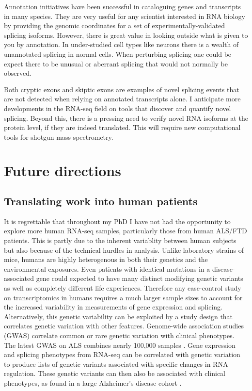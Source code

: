 Annotation initiatives have been successful in cataloguing genes and transcripts in many species.
They are very useful for any scientist interested in RNA biology by providing the genomic coordinates for a set of experimentally-validated splicing isoforms.
However, there is great value in looking outside what is given to you by annotation.
In under-studied cell types like neurons there is a wealth of unannotated splicing in normal cells.
When perturbing splicing one could be expect there to be unusual or aberrant splicing that would not normally be observed. 

Both cryptic exons and skiptic exons are examples of novel splicing events that are not detected when relying on annotated transcripts alone.
I anticipate more developments in the RNA-seq field on tools that discover and quantify novel splicing.
Beyond this, there is a pressing need to verify novel RNA isoforms at the protein level, if they are indeed translated. 
This will require new computational tools for shotgun mass spectrometry.

	
\section{Future directions}

\subsection{Translating work into human patients}

It is regrettable that throughout my PhD I have not had the opportunity to explore more human RNA-seq samples, particularly those from human ALS/FTD patients.
This is partly due to the inherent variablity between human subjects but also because of the technical hurdles in analysis.
Unlike laboratory strains of mice, humans are highly heterogenous in both their genetics and the environmental exposures.
Even patients with identical mutations in a disease-associated gene could  expected to have many distinct modifying genetic variants as well as completely different life experiences.
Therefore any case-control study on transcriptomics in humans requires a much larger sample sizes to account for the increased variability in measurements of gene expression and splicing.
Alternatively, this genetic variability can be exploited by a study design that correlates genetic variation with other features. 
Genome-wide association studies (GWAS) correlate common or rare genetic variation with clinical phenotypes.
The latest GWAS on ALS combines nearly 100,000 samples \citep{Nicolas2018}.
Gene expression and splicing phenotypes from RNA-seq can be correlated with genetic variation to produce lists of genetic variants associated with specific changes in RNA regulation.
These genetic variants can then also be associated with clinical phenotypes, as found in a large Alzheimer's disease cohort \citep{Raj2018}.

